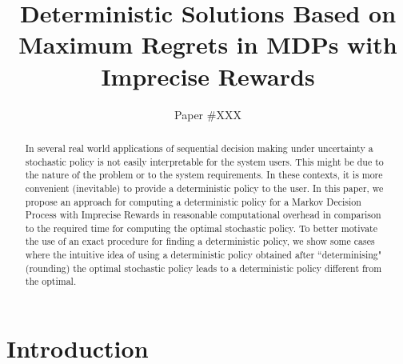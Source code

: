 \documentclass[sigconf]{aamas}  %
\begin{document}
\title{Deterministic Solutions Based on Maximum Regrets in MDPs with Imprecise Rewards}

\author{Paper \#XXX}  %


\begin{abstract}  %
In several real world applications of sequential decision making under uncertainty a stochastic policy is not easily interpretable for the system users. This might be due to the nature of the problem or to the system requirements. In these contexts, it is more convenient (inevitable) to provide a deterministic policy to the user. In this paper, we propose an approach for computing a deterministic policy for a Markov Decision Process with Imprecise Rewards in reasonable computational overhead in comparison to the required time for computing the optimal stochastic policy. To better motivate the use of an exact procedure for finding a deterministic policy, we show some cases where the intuitive idea of using a deterministic policy obtained after ``determinising" (rounding) the optimal stochastic policy leads to a deterministic policy different from the optimal.
\end{abstract}



\maketitle



\section{Introduction}


\end{document}
